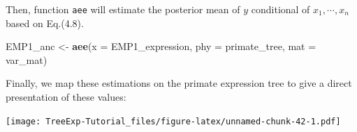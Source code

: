 \documentclass[]{book}
\newenvironment{Shaded}{\begin{snugshade}}{\end{snugshade}}
\newcommand{\DataTypeTok}[1]{\textcolor[rgb]{0.13,0.29,0.53}{#1}}
\newcommand{\DecValTok}[1]{\textcolor[rgb]{0.00,0.00,0.81}{#1}}
\newcommand{\KeywordTok}[1]{\textcolor[rgb]{0.13,0.29,0.53}{\textbf{#1}}}
\newcommand{\NormalTok}[1]{#1}
\newcommand{\OperatorTok}[1]{\textcolor[rgb]{0.81,0.36,0.00}{\textbf{#1}}}
\newcommand{\OtherTok}[1]{\textcolor[rgb]{0.56,0.35,0.01}{#1}}
\newcommand{\StringTok}[1]{\textcolor[rgb]{0.31,0.60,0.02}{#1}}
\begin{document}
Then, function \texttt{aee} will estimate the posterior mean of \(y\) conditional of \(x_1,\cdots,x_n\) based on Eq.(4.8).

\begin{Shaded}
\begin{Highlighting}[]
\NormalTok{EMP1_anc <-}\StringTok{ }\KeywordTok{aee}\NormalTok{(}\DataTypeTok{x =}\NormalTok{ EMP1_expression, }\DataTypeTok{phy =}\NormalTok{ primate_tree, }\DataTypeTok{mat =}\NormalTok{ var_mat)}
\end{Highlighting}
\end{Shaded}

Finally, we map these estimations on the primate expression tree to give a direct presentation of these values:

\begin{Shaded}
\end{Shaded}

\texttt{[image: TreeExp-Tutorial\_files/figure-latex/unnamed-chunk-42-1.pdf]}


\end{document}
